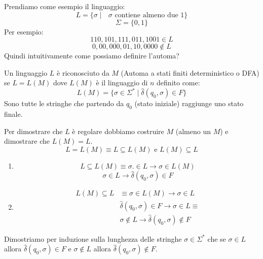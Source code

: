 \documentclass[a4paper]{article}
\begin{document}
\ex{}
{
    Prendiamo come esempio il linguaggio:
    \[L = \{\sigma \; | \; \text{ $\sigma$ contiene almeno due 1}\}\]
    \[\Sigma = \{0,1\}\]
    Per esempio:
    \[110, 101, 111, 011, 1001 \in L\]
    \[0, 00, 000, 01, 10, 0000 \notin L\]
    Quindi intuitivamente come possiamo definire l'automa?
    \begin{figure}[H]
        \centering
      \end{figure}
    \noindent
    Un linguaggio $L$ è riconosciuto da $M$ (Automa a stati finiti deterministico o DFA)
    se $L = L(M)$ dove $L(M)$ è il linguaggio di $n$ definito come:
    \[L(M) = \{\sigma \in \Sigma^* \; | \; \hat{\delta}(q_0, \sigma) \in F\}\]
    Sono tutte le stringhe che partendo da $q_0$ (stato iniziale) raggiunge uno stato finale.
}
\dfn{}
{
    Per dimostrare che $L$ è regolare dobbiamo costruire $M$ (almeno un $M$) e dimostrare che
    $L(M) = L$.
}
\[L = L(M) \equiv L \subseteq L(M) \text{ e } L(M) \subseteq L\]
\begin{enumerate}
    \item \[L \subseteq L(M) \equiv \sigma . \in L \rightarrow \sigma \in L(M)\]
    \[\sigma \in L \rightarrow \hat{\delta}(q_0, \sigma) \in F\]
    \item 
    \[
    \begin{aligned}
        L(M) \subseteq L &\equiv \sigma \in L(M) \rightarrow \sigma \in L\\
        & \hat{\delta}(q_0, \sigma) \in F \rightarrow \sigma \in L \equiv \\
        &\sigma \notin L \rightarrow \hat{\delta}(q_0, \sigma) \notin F
    \end{aligned}
    \]
\end{enumerate}
Dimostriamo per induzione sulla lunghezza delle stringhe $\sigma \in \Sigma^*$ che
se $\sigma \in L$ allora $\hat{\delta}(q_0, \sigma) \in F$
e $\sigma \notin L$ allora $\hat{\delta}(q_0, \sigma) \notin F$.
\end{document}
